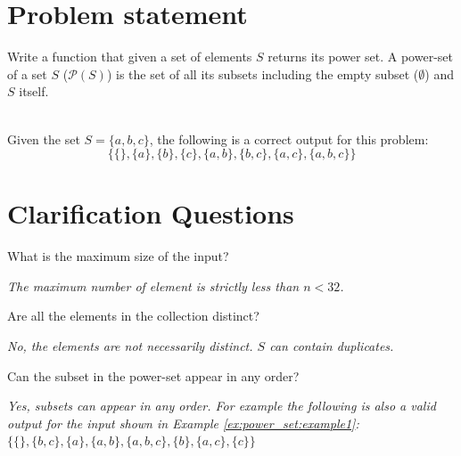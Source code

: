 \section{Problem statement}
    \begin{exercise}
        Write a function that given a set of elements $S$ returns its power set.
        A power-set of a set $S$ ($\mathcal{P}(S)$) is the set of all its subsets including the empty subset
        ($\emptyset$) and $S$ itself.

        \begin{example}
            \label{ex:power_set:example1}
            \hfill \\
            Given the set $S=\{a,b,c\}$, the following is a correct output for
            this problem: $$\{\{\}, \{a\}, \{b\}, \{c\}, \{a,b\}, \{b,c\}, \{a,c\}, \{a,b,c\} \}$$
        \end{example}
    \end{exercise}

\section{Clarification Questions}

\begin{QandA}
    \item What is the maximum size of the input?
    \begin{answered}
        \textit{The maximum number of element is strictly less than $n < 32$.}
    \end{answered}
    
    \item Are all the elements in the collection distinct?
    \begin{answered}
        \textit{No, the elements are not necessarily distinct. $S$ can contain duplicates.}
    \end{answered}

    \item Can the subset in the power-set appear in any order?
    \begin{answered}
        \textit{Yes, subsets can appear in any order. 
        For example the following is also a valid output for the input shown in Example \ref{ex:power_set:example1}:} 
        $\{\{\}, \{b,c\}, \{a\}, \{a,b\}, \{a,b,c\}, \{b\}, \{a,c\}, \{c\} \}$
    \end{answered}
\end{QandA}

